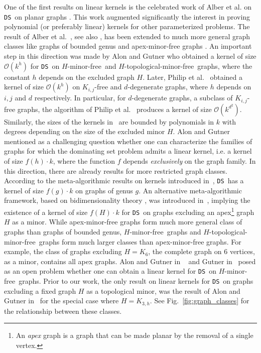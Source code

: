 \documentclass[11pt]{article}
\newcommand{\tHmf}{$H$-topological-minor-free}
\newcommand{\Hmf}{$H$-minor-free}
\newcommand{\tDS}{{\texttt{\sc DS}}}
\newcommand{\cO}{\mathcal{O}}
\begin{document}
    
  One of  the  first  results  on linear kernels is the celebrated work of Alber et al.  on  \tDS \,  on planar graphs \cite{AlberFN04}. This work  augmented significantly the interest in  proving polynomial (or preferably linear) 
 kernels for other parameterized problems.   
  The result of Alber et al.~\cite{AlberFN04}, see also  \cite{ChenFKX07}, has been extended to much more general graph classes like graphs of bounded genus \cite{H.Bodlaender:2009ng} and apex-minor-free graphs \cite{F.V.Fomin:2010oq}.
An important step in this direction was made by  Alon and Gutner \cite{AG08TechReport,Gutner09}  who obtained a kernel of size $\cO(k^{h})$ for  \tDS \,  on \Hmf\,  and \tHmf\,  graphs, where the constant $h$ depends on the excluded graph $H$. Later, Philip et al.~\cite{PhilipRS09} obtained a kernel of size $\cO(k^{h})$ on  $K_{i,j}$-free and $d$-degenerate graphs, where $h$ depends on $i,j$ and $d$ respectively.  In particular, for $d$-degenerate graphs, a subclass of $K_{i,j}$-free graphs,  the algorithm of   Philip et al.~\cite{PhilipRS09} produces a kernel of size
 $\cO(k^{d^2})$. Similarly, the sizes of   the kernels in~\cite{AG08TechReport,Gutner09,PhilipRS09} are bounded by  polynomials in $k$ with degrees depending on the size of the excluded minor $H$. 
  Alon and Gutner \cite{AG08TechReport} mentioned as a  challenging question  whether one can  characterize the families of graphs for which the dominating set problem admits a linear kernel, i.e. a kernel  of size $f(h)\cdot k $, where the function $f$ depends {\em exclusively} on the 
graph family. 
In this direction, there are already results for more restricted graph classes.
According to
the meta-algorithmic results on kernels introduced in~\cite{H.Bodlaender:2009ng},  \tDS \,  has a kernel 
of size $f(g)\cdot k$ on graphs of genus $g$. An alternative meta-algorithmic 
framework, based on bidimensionality theory \cite{DemaineFHT05sub}, was introduced in~\cite{F.V.Fomin:2010oq}, implying the existence of a kernel of size $f(H)\cdot k$ for \tDS \, on graphs excluding an { apex\footnote{An {\em apex} graph is a graph that can be made planar by the removal of a single vertex.}} graph $H$ as a minor. While apex-minor-free graphs form much more general class of graphs than  graphs of bounded genus, \Hmf\,  graphs  and \tHmf\, graphs form much larger classes than apex-minor-free graphs. For example, the class of graphs excluding $H=K_6$, the complete  graph on $6$ vertices, as a minor, contains all apex graphs. Alon and Gutner in ~\cite{AG08TechReport} and Gutner  in~\cite{Gutner09} posed as an open problem  
whether one can obtain a linear kernel for \tDS \,  on \Hmf\,  graphs.
Prior to our work, the only result on linear kernels for \tDS \, on graphs excluding a fixed graph $H$ as a topological minor, was the result of  
 Alon and Gutner  in~\cite{AG08TechReport}  for the  special case where $H=K_{3,h}$.
See Fig.~\ref{fig:graph_classes} for the relationship between these classes.  
\end{document}
